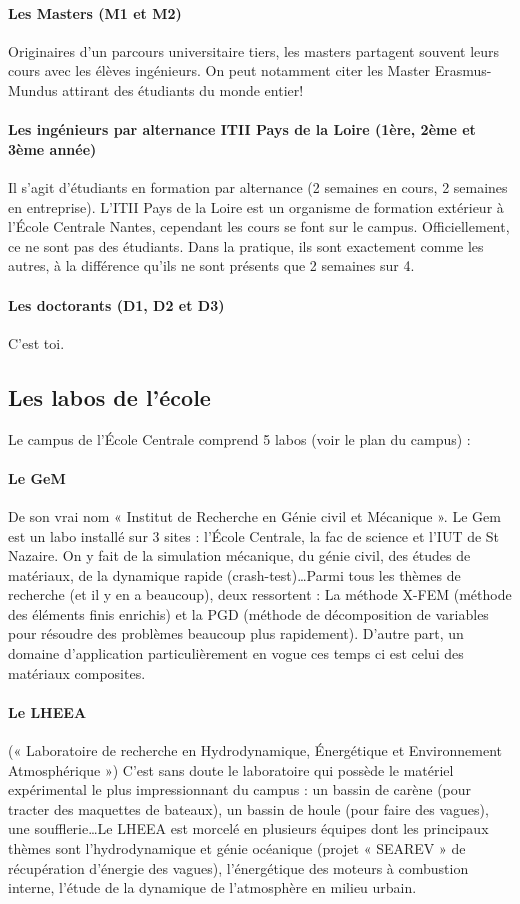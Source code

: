 \paragraph{Les Masters (M1 et M2)} Originaires d'un parcours universitaire tiers, les masters partagent souvent leurs cours avec les élèves ingénieurs. On peut notamment citer les Master Erasmus-Mundus attirant des étudiants du monde entier!
\paragraph{Les ingénieurs par alternance ITII Pays de la Loire (1ère, 2ème et 3ème année)} Il s'agit d'étudiants en formation par alternance (2 semaines en cours, 2 semaines en entreprise). L'ITII Pays de la Loire est un organisme de formation extérieur à l'École Centrale Nantes, cependant les cours se font sur le campus. Officiellement, ce ne sont pas des étudiants. Dans la pratique, ils sont exactement comme les autres, à la différence qu'ils ne sont présents que 2 semaines sur 4.
\paragraph{Les doctorants (D1, D2 et D3)} C'est toi.

\subsection{Les labos de l'école}\trad
Le campus de l'École Centrale comprend 5 labos (voir le plan du campus) :
\paragraph{Le GeM} De son vrai nom « Institut de Recherche en Génie civil et Mécanique ». Le Gem est un labo installé sur 3 sites : l'École Centrale, la fac de science et l'IUT de St Nazaire. On y fait de la simulation mécanique, du génie civil, des études de matériaux, de la dynamique rapide (crash-test)\dots Parmi tous les thèmes de recherche (et il y en a beaucoup), deux ressortent : La méthode X-FEM (méthode des éléments finis enrichis) et la PGD (méthode de décomposition de variables pour résoudre des problèmes beaucoup plus rapidement). D'autre part, un domaine d'application particulièrement en vogue ces temps ci est celui des matériaux composites.
\paragraph{Le LHEEA} (« Laboratoire de recherche en Hydrodynamique, Énergétique et Environnement Atmosphérique ») C'est sans doute le laboratoire qui possède le matériel expérimental le plus impressionnant du campus : un bassin de carène (pour tracter des maquettes de bateaux), un bassin de houle (pour faire des vagues), une soufflerie\dots Le LHEEA est morcelé en plusieurs équipes dont les principaux thèmes sont l'hydrodynamique et génie océanique (projet « SEAREV » de récupération d'énergie des vagues), l'énergétique des moteurs à combustion interne, l'étude de la dynamique de l'atmosphère en milieu urbain.
